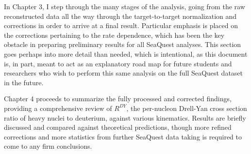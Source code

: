 \documentclass[edeposit,fullpage]{uiucthesis2009}
\begin{document}
In Chapter 3, I step through the many stages of the analysis, going from the raw reconstructed data all the way through the target-to-target normalization and corrections in order to arrive at a final result. Particular emphasis is placed on the corrections pertaining to the rate dependence, which has been the key obstacle in preparing preliminary results for all SeaQuest analyses. This section goes perhaps into more detail than needed, which is intentional, as this document is, in part, meant to act as an explanatory road map for future students and researchers who wish to perform this same analysis on the full SeaQuest dataset in the future.

Chapter 4 proceeds to summarize the fully processed and corrected findings, providing a comprehensive review of $R^{DY}$, the per-nucleon Drell-Yan cross section ratio of heavy nuclei to deuterium, against various kinematics. Results are briefly discussed and compared against theoretical predictions, though more refined corrections and more statistics from further SeaQuest data taking is required to come to any firm conclusions.



%
%


%


\appendix



\backmatter



\end{document}
